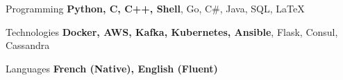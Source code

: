 

\begin{cvskills}

  \cvskill
    {Programming} %
    {\textbf{Python, C, C++, Shell}, Go, C\#, Java, SQL, LaTeX} %

  \cvskill
    {Technologies} %
    {\textbf{Docker, AWS, Kafka, Kubernetes, Ansible}, Flask, Consul, Cassandra} %

  \cvskill
    {Languages} %
    {\textbf{French (Native), English (Fluent)}} %

\end{cvskills}